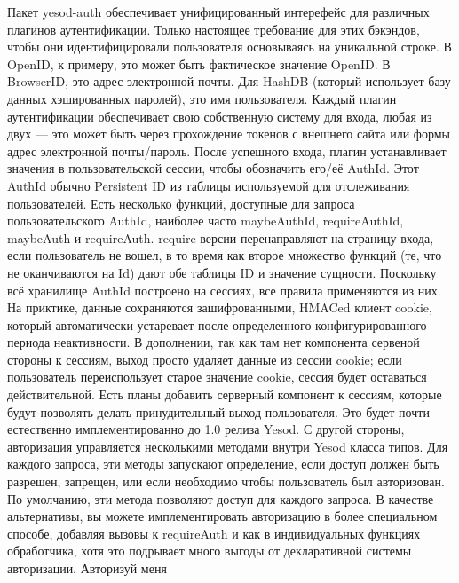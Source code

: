Пакет yesod-auth обеспечивает унифицированный интерефейс для различных плагинов аутентификации. Только настоящее требование для этих бэкэндов, чтобы они идентифицировали пользователя основываясь на уникальной строке. В OpenID, к примеру, это может быть фактическое значение OpenID. В BrowserID, это адрес электронной почты. Для HashDB (который использует базу данных хэшированных паролей), это имя пользователя.
Каждый плагин аутентификации обеспечивает свою собственную систему для входа, любая из двух — это может быть через прохождение токенов с внешнего сайта или формы адрес электронной почты/пароль. После успешного входа, плагин устанавливает значения в пользовательской сессии, чтобы обозначить его/её AuthId. Этот AuthId обычно Persistent ID из таблицы используемой для отслеживания пользователей. 
Есть несколько функций, доступные для запроса пользовательского AuthId, наиболее часто maybeAuthId, requireAuthId, maybeAuth и requireAuth. require версии перенаправляют на страницу входа, если пользователь не вошел, в то время как второе множество функций (те, что не оканчиваются на Id) дают обе таблицы ID и значение сущности.
Поскольку всё хранилище AuthId построено на сессиях, все правила применяются из них. На приктике, данные сохраняются зашифрованными, HMACed клиент cookie, который автоматически устаревает после определенного конфигурированного периода неактивности. В дополнении, так как там нет компонента сервеной стороны к сессиям, выход просто удаляет данные из сессии cookie; если пользователь переиспользует старое значение cookie, сессия будет оставаться действительной.
Есть планы добавить серверный компонент к сессиям, которые будут позволять делать принудительный выход пользователя. Это будет почти естественно имплементированно до 1.0 релиза Yesod.
С другой стороны, авторизация управляется несколькими методами внутри Yesod класса типов. Для каждого запроса, эти методы запускают определение, если доступ должен быть разрешен, запрещен, или если необходимо чтобы пользователь был авторизован. По умолчанию, эти метода позволяют доступ для каждого запроса. В качестве альтернативы, вы можете имплементировать авторизацию в более специальном способе, добавляя вызовы к requireAuth и как в индивидуальных функциях обработчика, хотя это подрывает много выгоды от декларативной системы авторизации.
Авторизуй меня

